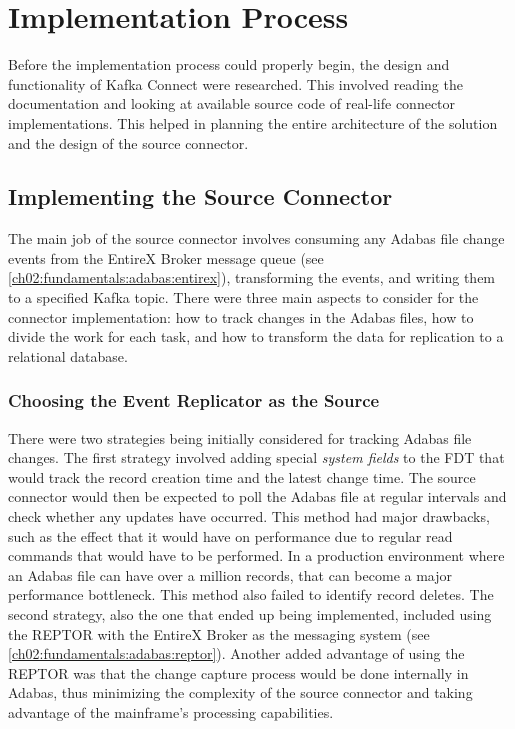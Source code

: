 \section{Implementation Process}
Before the implementation process could properly begin, the design and functionality of Kafka Connect were researched. This involved reading the documentation and looking at available source code of real-life connector implementations. This helped in planning the entire architecture of the solution and the design of the source connector.

\subsection{Implementing the Source Connector}
The main job of the source connector involves consuming any Adabas file change events from the EntireX Broker message queue (see \ref{ch02:fundamentals:adabas:entirex}), transforming the events, and writing them to a specified Kafka topic. There were three main aspects to consider for the connector implementation: how to track changes in the Adabas files, how to divide the work for each task, and how to transform the data for replication to a relational database.

\subsubsection{Choosing the Event Replicator as the Source}
There were two strategies being initially considered for tracking Adabas file changes. The first strategy involved adding special \textit{system fields} to the \ac{FDT} that would track the record creation time and the latest change time. The source connector would then be expected to poll the Adabas file at regular intervals and check whether any updates have occurred. This method had major drawbacks, such as the effect that it would have on performance due to regular read commands that would have to be performed. In a production environment where an Adabas file can have over a million records, that can become a major performance bottleneck. This method also failed to identify record deletes. The second strategy, also the one that ended up being implemented, included using the \ac{REPTOR} with the EntireX Broker as the messaging system (see \ref{ch02:fundamentals:adabas:reptor}). Another added advantage of using the \ac{REPTOR} was that the change capture process would be done internally in Adabas, thus minimizing the complexity of the source connector and taking advantage of the mainframe's processing capabilities.

